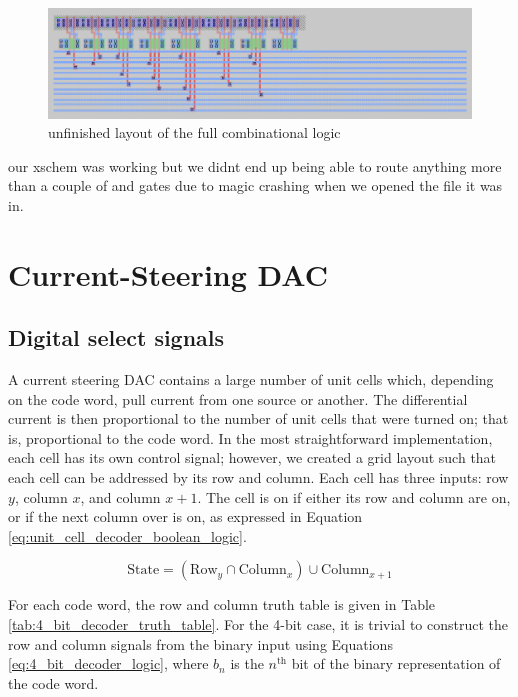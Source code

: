 \documentclass{article}
\begin{document}
\begin{figure}
    \centering
    \includegraphics[width=0.8\linewidth]{images/not used yet/nand_tree_cl.png}
    \caption{unfinished layout of the full combinational logic}
    \label{fig:lds_sin}
\end{figure}

our xschem was working but we didnt end up being able to route anything more than a couple of and gates due to magic crashing when we opened the file it was in.




\section{Current-Steering DAC}
\subsection{Digital select signals}
A current steering DAC contains a large number of unit cells which, depending on the code word, pull current from one source or another. The differential current is then proportional to the number of unit cells that were turned on; that is, proportional to the code word. In the most straightforward implementation, each cell has its own control signal; however, we created a grid layout such that each cell can be addressed by its row and column. Each cell has three inputs: row $y$, column $x$, and column $x+1$. The cell is on if either its row and column are on, or if the next column over is on, as expressed in Equation \ref{eq:unit_cell_decoder_boolean_logic}.

\begin{equation}
    \label{eq:unit_cell_decoder_boolean_logic}
    \text{State} = (\text{Row}_y \cap \text{Column}_x) \cup \text{Column}_{x+1}
\end{equation}

For each code word, the row and column truth table is given in Table \ref{tab:4_bit_decoder_truth_table}. For the 4-bit case, it is trivial to construct the row and column signals from the binary input using Equations \ref{eq:4_bit_decoder_logic}, where $b_n$ is the $n^{\text{th}}$ bit of the binary representation of the code word.
\end{document}
